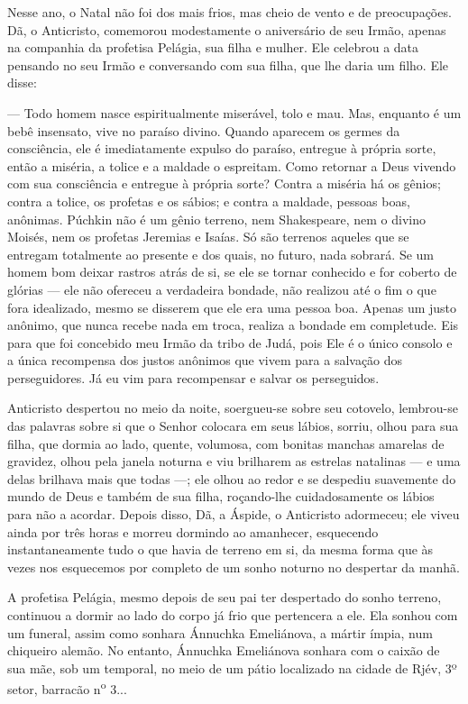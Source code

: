 Nesse ano, o Natal não foi dos mais frios, mas cheio de vento e de
preocupações. Dã, o Anticristo, comemorou modestamente o aniversário de
seu Irmão, apenas na companhia da profetisa Pelágia, sua filha e mulher.
Ele celebrou a data pensando no seu Irmão e conversando com sua filha,
que lhe daria um filho. Ele disse:

--- Todo homem nasce espiritualmente miserável, tolo e mau. Mas,
enquanto é um bebê insensato, vive no paraíso divino. Quando aparecem os
germes da consciência, ele é imediatamente expulso do paraíso, entregue
à própria sorte, então a miséria, a tolice e a maldade o espreitam. Como
retornar a Deus vivendo com sua consciência e entregue à própria sorte?
Contra a miséria há os gênios; contra a tolice, os profetas e os sábios;
e contra a maldade, pessoas boas, anônimas. Púchkin não é um gênio
terreno, nem Shakespeare, nem o divino Moisés, nem os profetas Jeremias
e Isaías. Só são terrenos aqueles que se entregam totalmente ao presente
e dos quais, no futuro, nada sobrará. Se um homem bom deixar rastros
atrás de si, se ele se tornar conhecido e for coberto de glórias --- ele
não ofereceu a verdadeira bondade, não realizou até o fim o que fora
idealizado, mesmo se disserem que ele era uma pessoa boa. Apenas um
justo anônimo, que nunca recebe nada em troca, realiza a bondade em
completude. Eis para que foi concebido meu Irmão da tribo de Judá, pois
Ele é o único consolo e a única recompensa dos justos anônimos que vivem
para a salvação dos perseguidores. Já eu vim para recompensar e salvar
os perseguidos.

Anticristo despertou no meio da noite, soergueu-se sobre seu cotovelo,
lembrou-se das palavras sobre si que o Senhor colocara em seus lábios,
sorriu, olhou para sua filha, que dormia ao lado, quente, volumosa, com
bonitas manchas amarelas de gravidez, olhou pela janela noturna e viu
brilharem as estrelas natalinas --- e uma delas brilhava mais que todas
---; ele olhou ao redor e se despediu suavemente do mundo de Deus e
também de sua filha, roçando-lhe cuidadosamente os lábios para não a
acordar. Depois disso, Dã, a Áspide, o Anticristo adormeceu; ele viveu
ainda por três horas e morreu dormindo ao amanhecer, esquecendo
instantaneamente tudo o que havia de terreno em si, da mesma forma que
às vezes nos esquecemos por completo de um sonho noturno no despertar da
manhã.

A profetisa Pelágia, mesmo depois de seu pai ter despertado do sonho
terreno, continuou a dormir ao lado do corpo já frio que pertencera a
ele. Ela sonhou com um funeral, assim como sonhara Ánnuchka Emeliánova,
a mártir ímpia, num chiqueiro alemão. No entanto, Ánnuchka Emeliánova
sonhara com o caixão de sua mãe, sob um temporal, no meio de um pátio
localizado na cidade de Rjév, 3º setor, barracão n\textsuperscript{o}
3...

